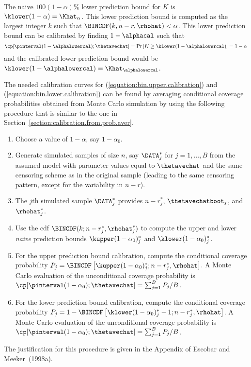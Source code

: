 The naive $100(1-\alpha)\%$ lower prediction bound for $K$ is
$\klower(1-\alpha)=\Khat_{\alpha}$.  This lower prediction bound is
computed as the largest integer $k$ such that
$\BINCDF(k,n-r,\rhohat) < \alpha$.  This lower prediction bound can
be calibrated by finding $1-\alphacal$ such that
\begin{equation}
\label{equation:bin.lower.calibration}
\cp[\pinterval(1-\alphalowercal); \thetavechat]=
\Pr\left [K \geq \klower(1-\alphalowercal)\right] =  1 - \alpha
\end{equation}
and the calibrated lower prediction bound would be 
$\klower(1-\alphalowercal)=\Khat_{\alphalowercal}$.

The needed calibration curves for
(\ref{equation:bin.upper.calibration}) and
(\ref{equation:bin.lower.calibration}) can be found by averaging
conditional coverage probabilities obtained from Monte Carlo
simulation by using the following procedure that is similar to the
one in Section~\ref{section:calibration.from.prob.aver}.
\begin{enumerate}
\item
Choose a value of $1-\alpha$, say $1-\alpha_{0}$.
\item
Generate simulated samples of size $n$, say $\DATA^{*}_{j}$ for $j=1,
\dots, B$ from the assumed model with parameter values equal to
$\thetavechat$ and the same censoring scheme as in the original sample
(leading to the same censoring pattern, except for the variability in
$n-r$).
\item
The $j$th simulated sample $\DATA^{*}_{j}$ provides $n-r^{*}_{j}$,
$\thetavechatboot_{j}$, and $\rhohat^{*}_{j}$.
\item
Use the cdf $\BINCDF(k;n-r_{j}^{*},\rhohat_{j}^{*})$ to compute the
upper and lower {\em naive} prediction bounds
$\kupper(1-\alpha_{0})^{*}_{j}$ and $\klower(1-\alpha_{0})^{*}_{j}$.
\item
For the upper prediction bound calibration, compute the conditional
coverage probability $P_{j}=\BINCDF\left
[\kupper(1-\alpha_{0})^{*}_{j}; n-r_{j}^{*},\rhohat \right ]$. A Monte
Carlo evaluation of the unconditional coverage probability is
$\cp[\pinterval(1-\alpha_{0})
;\thetavechat]=\sum_{j=1}^{B}P_{j}/B$.  
\item
For the lower prediction bound calibration, compute the conditional
coverage probability $P_{j}=1-\BINCDF \left
[\klower(1-\alpha_{0})^{*}_{j}-1; n-r_{j}^{*},\rhohat \right ]$. A
Monte Carlo evaluation of the unconditional coverage probability is
$\cp[\pinterval(1-\alpha_{0})
;\thetavechat]=\sum_{j=1}^{B}P_{j}/B$.
\end{enumerate}
The justification for this procedure is given in 
the Appendix of Escobar and Meeker~(1998a).


